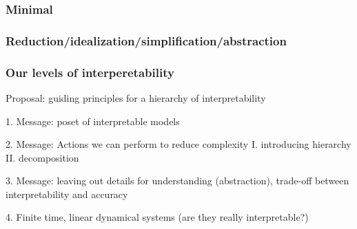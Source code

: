 \documentclass{article}
\theoremstyle{definition} \newtheorem{definition}{Definition}  \newtheorem{example}{Example}
\theoremstyle{remark} \newtheorem{remark}{Remark}
\newcounter{ct}
\begin{document}
\subsubsection{Minimal}
\citep{beer1996toward}
\citep{lafferriere2000minimal}
\citep{chirimuuta2014minimal}
\citep{batterman2014minimal}
\citep{brancazio2023minimal}
\citep{Jordan2019a}


\subsubsection{Reduction/idealization/simplification/abstraction}
\citep{marr1976computation, marr2010vision}
\citep{chirimuuta2018mmm} %
\citep{kriegeskorte2019peeling}
\citep{potochnik2021levels,
potochnik2020idealization,
potochnik2017idealization}
\citep{stinson2020idealized}
\citep{chirimuuta2024brain} 
\citep{levenstein2023theory}


\subsubsection{Our levels of interperetability}
Proposal: guiding principles for a hierarchy of interpretability

1. Message: poset of interpretable models

2. Message: Actions we can perform to reduce complexity
I. introducing hierarchy 
\citep{Vermani2024b}
\citep{geadah2024parsing, geadah2025modeling}
II. decomposition

3. Message: leaving out details for understanding (abstraction), trade-off between interpretability and accuracy

4. Finite time, linear dynamical systems (are they really interpretable?) 






\end{document}
